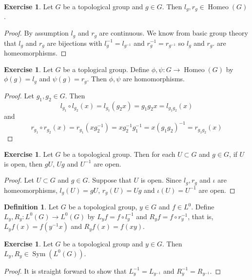 \documentclass[12pt]{amsart}
\theoremstyle{definition}
\newtheorem{defn}[definition]{Definition}
\newtheorem{ex}[definition]{Exercise}
\DeclareMathOperator{\Homeo}{Homeo}
\DeclareMathOperator{\Sym}{Sym}
\DeclareMathOperator*{\0}{\mbf{0}}
\DeclareMathOperator*{\1}{\mbf{1}}
\newcommand{\lex}[1]{\label{ex:#1}}
\newcommand{\ld}[1]{\label{defn:#1}}
\begin{document}
	\begin{ex} \lex{00000} 
		Let $G$ be a topological group and $g \in G$. Then $l_g, r_g \in \Homeo(G)$.
	\end{ex}
	
	\begin{proof}
		By assumption $l_g$ and $r_g$ are continuous. We know from basic group theory that $l_g$ and $r_g$ are bijections with $l_g^{-1} = l_{g^{-1}}$ and $r_g^{-1} = r_{g^{-1}}$ so $l_g$ and $r_g$. are homeomorphisms. 
	\end{proof}
	
	\begin{ex} \lex{00000} 
	Let $G$ be a toplogical group. Define $\phi, \psi:G \rightarrow \Homeo(G)$ by $\phi(g) = l_g$ and $\psi(g) = r_g$. Then $\phi, \psi$ are homomorphisms.
	\end{ex}
	
	\begin{proof}
	Let $g_1, g_2 \in G$. Then $$l_{g_1} \circ l_{g_2}(x) = l_{g_1}(g_2 x) = g_1 g_2 x= l_{g_1 g_2}(x)$$ and $$r_{g_1} \circ r_{g_2} (x) = r_{g_1}(x g_2^{-1})= xg_2^{-1}g_1^{-1} = x(g_1g_2)^{-1} = r_{g_1g_2}(x)$$ 
	\end{proof}
	
	\begin{ex} \lex{00000} 
		Let $G$ be a topological group. Then for each $U \subset G$ and $g \in G$, if $U$ is open, then $gU$, $Ug$ and $U^{-1}$ are open. 
	\end{ex}
	\begin{proof}
		Let $U \subset G$ and $g \in G$. Suppose that $U$ is open. Since $l_g, r_g$ and $\iota$ are homeomorphisms, $l_g(U) = gU$, $r_g(U) = Ug$ and $\iota(U) = U^{-1}$ are open. 
	\end{proof}
	
	\begin{defn} \ld{00000} 
		Let $G$ be a topological group, $y \in G$ and $f \in L^0$.  Define $L_y, R_y: L^0(G) \rightarrow L^0(G)$ by $L_y f = f \circ l_y^{-1}$ and $R_y f = f \circ r_y^{-1}$, that is, $L_yf(x) = f(y^{-1}x)$ and $R_yf(x) = f(xy)$.
	\end{defn}
	
	\begin{ex} \lex{00000} 
	Let $G$ be a topological group and $y \in G$. Then $L_y, R_y \in \Sym(L^0(G))$. 
	\end{ex}
	
	\begin{proof}
	It is straight forward to show that $L_y^{-1} = L_{y^{-1}}$ and $R_y^{-1} = R_{y^{-1}}$. 
	\end{proof}
	
\end{document}
